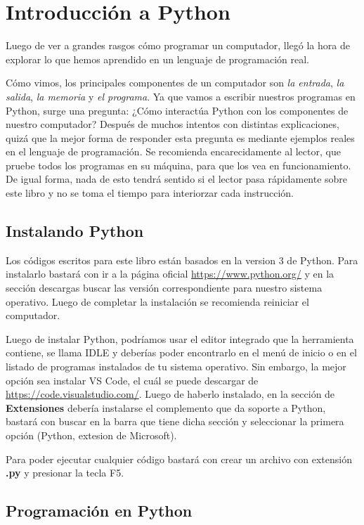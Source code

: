 \chapter{Introducción a Python}

Luego de ver a grandes rasgos cómo programar un computador, llegó la hora de explorar lo que hemos aprendido en un lenguaje de programación real. 

Cómo vimos, los principales componentes de un computador son \emph{la entrada}, \emph{la salida}, \emph{la memoria} y \emph{el programa}. Ya que vamos a escribir nuestros programas en Python, surge una pregunta: ¿Cómo interactúa Python con los componentes de nuestro computador? Después de muchos intentos con distintas explicaciones, quizá que la mejor forma de responder esta pregunta es mediante ejemplos reales en el lenguaje de programación. Se recomienda encarecidamente al lector, que pruebe todos los programas en su máquina, para que los vea en funcionamiento. De igual forma, nada de esto tendrá sentido si el lector pasa rápidamente sobre este libro y no se toma el tiempo para interiorzar cada instrucción.

\section{Instalando Python}

Los códigos escritos para este libro están basados en la version 3 de Python. Para instalarlo bastará con ir a la página oficial \url{https://www.python.org/} y en la sección descargas buscar las versión correspondiente para nuestro sistema operativo. Luego de completar la instalación se recomienda reiniciar el computador.

Luego de instalar Python, podríamos usar el editor integrado que la herramienta contiene, se llama IDLE y deberías poder encontrarlo en el menú de inicio o en el listado de programas instalados de tu sistema operativo. Sin embargo, la mejor opción sea instalar VS Code, el cuál se puede descargar de \url{https://code.visualstudio.com/}. Luego de haberlo instalado, en la sección de \textbf{Extensiones} debería instalarse el complemento que da soporte a Python, bastará con buscar en la barra que tiene dicha sección y seleccionar la primera opción (Python, extesion de Microsoft).

Para poder ejecutar cualquier código bastará con crear un archivo con extensión \textbf{.py} y presionar la tecla F5.

\section{Programación en Python}

